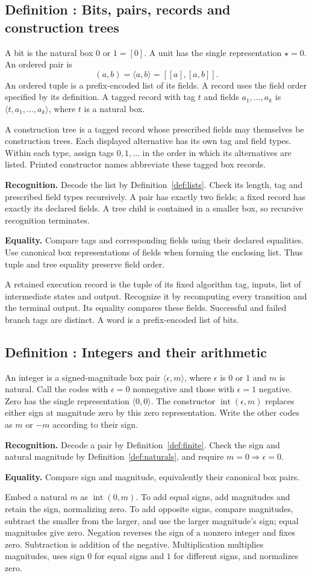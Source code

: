 \documentclass[11pt]{article}
\newcounter{definition}
\newcommand{\entry}[2]{%
  \refstepcounter{definition}\subsection*{#1 \thedefinition: #2}}
\newcommand{\definition}[1]{\entry{Definition}{#1}}
\newcommand{\checks}[2]{\begin{samepage}\par
  \textbf{Recognition.} #1\par\nopagebreak[4]
  \textbf{Equality.} #2\par\end{samepage}}
\begin{document}
\definition{Bits, pairs, records and construction trees}\label{def:finite}
A bit is the natural box $0$ or $1=[0]$. A unit has the single
representation $\star=0$. An ordered pair is
\[
                     (a,b)=\langle a,b\rangle=[[a],[a,b]].
\]
An ordered tuple is a prefix-encoded list of its fields. A record uses
the field order specified by its definition. A tagged record with tag
$t$ and fields $a_1,\ldots,a_k$ is $\langle t,a_1,\ldots,a_k\rangle$,
where $t$ is a natural box.

A construction tree is a tagged record whose prescribed fields may
themselves be construction trees. Each displayed alternative has its own
tag and field types. Within each type, assign tags $0,1,\ldots$ in the
order in which its alternatives are listed. Printed constructor names
abbreviate these tagged box records.

\checks{Decode the list by Definition~\ref{def:lists}. Check its length,
tag and prescribed field types recursively. A pair has exactly two fields;
a fixed record has exactly its declared fields. A tree child is contained
in a smaller box, so recursive recognition terminates.}
{Compare tags and corresponding fields using their declared equalities.
Use canonical box representations of fields when forming the enclosing
list. Thus tuple and tree equality preserve field order.}

A retained execution record is the tuple of its fixed algorithm tag,
inputs, list of intermediate states and output. Recognize it by
recomputing every transition and the terminal output. Its equality
compares these fields. Successful and failed branch tags are distinct.
A word is a prefix-encoded list of bits.

\definition{Integers and their arithmetic}\label{def:integers}
An integer is a signed-magnitude box pair $\langle\epsilon,m\rangle$,
where $\epsilon$ is $0$ or $1$ and $m$ is natural.
Call the codes with $\epsilon=0$ nonnegative and those with $\epsilon=1$
negative. Zero has the single
representation $\langle0,0\rangle$.
The constructor $\operatorname{int}(\epsilon,m)$ replaces either sign
at magnitude zero by this zero representation. Write the other codes
as $m$ or $-m$ according to their sign.

\checks{Decode a pair by Definition~\ref{def:finite}. Check the sign
and natural magnitude by Definition~\ref{def:naturals}, and require
$m=0\Longrightarrow\epsilon=0$.}
{Compare sign and magnitude, equivalently their canonical box pairs.}

Embed a natural $m$ as $\operatorname{int}(0,m)$.
To add equal signs, add magnitudes and retain the sign, normalizing zero.
To add opposite signs, compare magnitudes, subtract the smaller from the
larger, and use the larger magnitude's sign; equal magnitudes give zero.
Negation reverses the sign of a nonzero integer and fixes zero.
Subtraction is addition of the negative. Multiplication multiplies
magnitudes, uses sign $0$ for equal signs and $1$ for different signs,
and normalizes zero.
\end{document}
